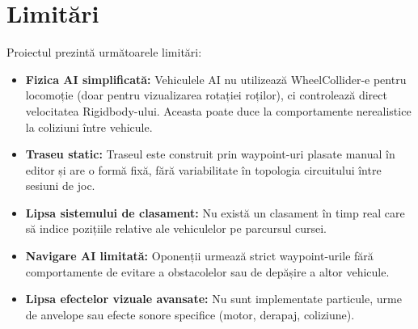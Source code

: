 \section{Limitări}
\label{sec:limitations}

Proiectul prezintă următoarele limitări:

\begin{itemize}
    \item \textbf{Fizica AI simplificată:} Vehiculele AI nu utilizează WheelCollider-e pentru locomoție (doar pentru vizualizarea rotației roților), ci controlează direct velocitatea Rigidbody-ului. Aceasta poate duce la comportamente nerealistice la coliziuni între vehicule.
    
    \item \textbf{Traseu static:} Traseul este construit prin waypoint-uri plasate manual în editor și are o formă fixă, fără variabilitate în topologia circuitului între sesiuni de joc.
    
    \item \textbf{Lipsa sistemului de clasament:} Nu există un clasament în timp real care să indice pozițiile relative ale vehiculelor pe parcursul cursei.
    
    \item \textbf{Navigare AI limitată:} Oponenții urmează strict waypoint-urile fără comportamente de evitare a obstacolelor sau de depășire a altor vehicule.
    
    \item \textbf{Lipsa efectelor vizuale avansate:} Nu sunt implementate particule, urme de anvelope sau efecte sonore specifice (motor, derapaj, coliziune).
\end{itemize}
